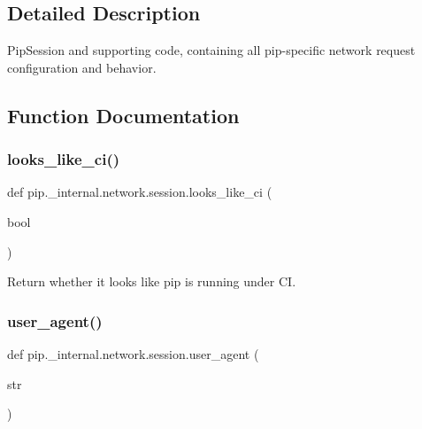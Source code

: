 \subsection{Detailed Description}
\begin{DoxyVerb}PipSession and supporting code, containing all pip-specific
network request configuration and behavior.
\end{DoxyVerb}
 

\subsection{Function Documentation}
\mbox{\label{namespacepip_1_1__internal_1_1network_1_1session_a1015d515d92f896dfff3998679899454}} 
\subsubsection{\texorpdfstring{looks\+\_\+like\+\_\+ci()}{looks\_like\_ci()}}
{\footnotesize\ttfamily def pip.\+\_\+internal.\+network.\+session.\+looks\+\_\+like\+\_\+ci (\begin{DoxyParamCaption}\item[{}]{bool }\end{DoxyParamCaption})}

\begin{DoxyVerb}Return whether it looks like pip is running under CI.
\end{DoxyVerb}
 \mbox{\label{namespacepip_1_1__internal_1_1network_1_1session_a34f028149b08d6e8d346fa1087b8956b}} 
\subsubsection{\texorpdfstring{user\+\_\+agent()}{user\_agent()}}
{\footnotesize\ttfamily def pip.\+\_\+internal.\+network.\+session.\+user\+\_\+agent (\begin{DoxyParamCaption}\item[{}]{str }\end{DoxyParamCaption})}

